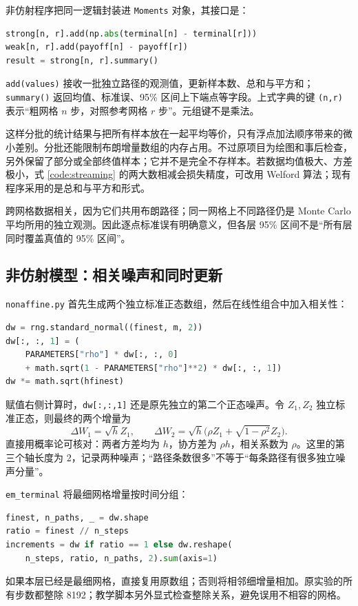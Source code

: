 非仿射程序把同一逻辑封装进 \texttt{Moments} 对象，其接口是：
\begin{lstlisting}[language=Python]
strong[n, r].add(np.abs(terminal[n] - terminal[r]))
weak[n, r].add(payoff[n] - payoff[r])
result = strong[n, r].summary()
\end{lstlisting}
\texttt{add(values)} 接收一批独立路径的观测值，更新样本数、总和与平方和；\texttt{summary()} 返回均值、标准误、95\% 区间上下端点等字段。上式字典的键 \texttt{(n,r)} 表示“粗网格 $n$ 步，对照参考网格 $r$ 步”。元组键不是乘法。

这样分批的统计结果与把所有样本放在一起平均等价，只有浮点加法顺序带来的微小差别。分批还能限制布朗增量数组的内存占用。不过原项目为绘图和事后检查，另外保留了部分或全部终值样本；它并不是完全不存样本。若数据均值极大、方差极小，式 \eqref{code:streaming} 的两大数相减会损失精度，可改用 Welford 算法；现有程序采用的是总和与平方和形式。

跨网格数据相关，因为它们共用布朗路径；同一网格上不同路径仍是 Monte Carlo 平均所用的独立观测。因此逐点标准误有明确意义，但各层 95\% 区间不是“所有层同时覆盖真值的 95\% 区间”。

\subsection{非仿射模型：相关噪声和同时更新}

\texttt{nonaffine.py} 首先生成两个独立标准正态数组，然后在线性组合中加入相关性：
\begin{lstlisting}[language=Python]
dw = rng.standard_normal((finest, m, 2))
dw[:, :, 1] = (
    PARAMETERS["rho"] * dw[:, :, 0]
    + math.sqrt(1 - PARAMETERS["rho"]**2) * dw[:, :, 1])
dw *= math.sqrt(hfinest)
\end{lstlisting}
赋值右侧计算时，\texttt{dw[:,:,1]} 还是原先独立的第二个正态噪声。令 $Z_1,Z_2$ 独立标准正态，则最终的两个增量为
\[
\Delta W_1=\sqrt h Z_1,\qquad
\Delta W_2=\sqrt h\bigl(\rho Z_1+\sqrt{1-\rho^2}Z_2\bigr).
\]
直接用概率论可核对：两者方差均为 $h$，协方差为 $\rho h$，相关系数为 $\rho$。这里的第三个轴长度为 2，记录两种噪声；“路径条数很多”不等于“每条路径有很多独立噪声分量”。

\texttt{em\_terminal} 将最细网格增量按时间分组：
\begin{lstlisting}[language=Python]
finest, n_paths, _ = dw.shape
ratio = finest // n_steps
increments = dw if ratio == 1 else dw.reshape(
    n_steps, ratio, n_paths, 2).sum(axis=1)
\end{lstlisting}
如果本层已经是最细网格，直接复用原数组；否则将相邻细增量相加。原实验的所有步数都整除 8192；教学脚本另外显式检查整除关系，避免误用不相容的网格。

